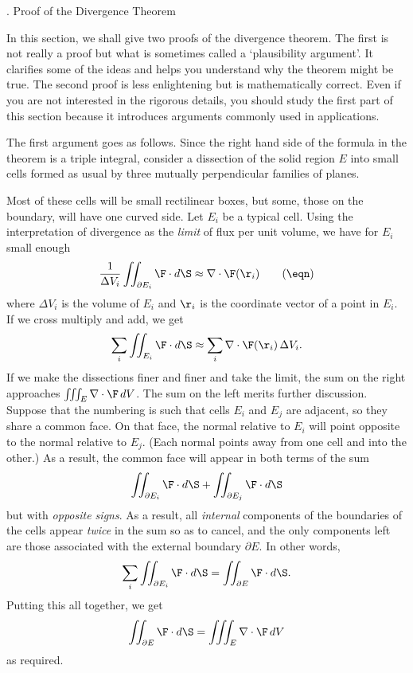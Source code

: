 \bigskip

\bigskip
{}
\head \sn. Proof of the Divergence Theorem \endhead

In this section, we shall give two proofs of the divergence theorem.
The first is not really a proof but what is sometimes called a
`plausibility argument'.   It clarifies some of the ideas and helps
you understand why the theorem might be true.  The second proof is
less enlightening but is mathematically correct.  Even if you
are not interested in the rigorous details, you should study
the first part of this section because it introduces arguments
commonly used in applications.

	The first argument goes as follows.   Since the right hand
side of the formula in the theorem is a triple integral, consider
a dissection of the solid region $E$ into small cells formed as
usual by three mutually perpendicular families of planes.  
\medskip
\centerline{}
\medskip
Most
of these cells will be small rectilinear boxes, but some, those
on the boundary, will have one curved side.  Let 
$E_i$ be a typical cell.   Using the interpretation of divergence
as the {\it limit\/} of flux per unit volume, we have for $E_i$
small enough
\nexteqn
$$
 \frac 1{\Delta V_i} \iint_{\partial E_i}\F\cdot d\S
\approx
      \nabla\cdot \F(\r_i)\tag\eqn 
$$
where $\Delta V_i$ is the volume of $E_i$ and $\r_i$ is the coordinate
vector of a point in $E_i$.  If we cross multiply and add, we get
$$
    \sum_i\iint_{E_i} \F\cdot d\S
 \approx
\sum_i \nabla\cdot \F(\r_i)\,\Delta V_i.
$$
If we make the dissections finer and finer and take the limit, the
sum on the right approaches $\iiint_E \nabla\cdot \F\,dV$.  The sum
on the left merits further discussion.  Suppose that the numbering
is such that  cells $E_i$ and $E_j$ are adjacent, so they share a
common face.  On that face,
the normal relative to $E_i$
will point opposite to the normal relative to $E_j$.   (Each
normal points away from one cell and into the other.)
As a result, the common face will appear in both
terms of the sum
$$
   \iint_{\partial E_i}\F\cdot d\S + \iint_{\partial E_j}
\F\cdot d\S
$$
but with {\it opposite signs}.  As a result, all {\it internal\/}
 components
of the boundaries of the cells   appear {\it twice\/} in the sum
so as to cancel, and the only components left are those associated
with the external boundary $\partial E$.  In other words,
$$
   \sum_i\iint_{\partial E_i}\F\cdot d\S = \iint_{\partial E} \F\cdot d\S.
$$
Putting this all together, we get
$$
 \iint_{\partial E} \F\cdot d\S = \iiint_E \nabla\cdot \F\,dV
$$
as required.


